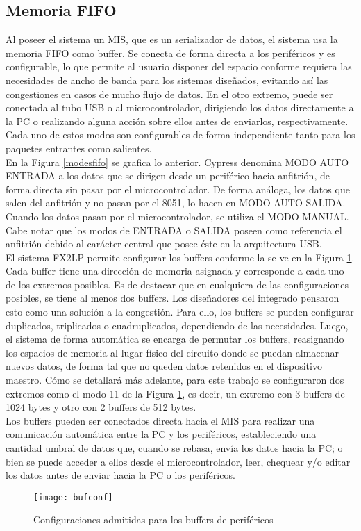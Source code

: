 	\subsection*{Memoria FIFO}
		Al poseer el sistema un MIS, que es un serializador de datos, el sistema usa la memoria FIFO como buffer.%
		Se conecta de forma directa a los periféricos y es configurable, lo que permite al usuario disponer del espacio conforme requiera las necesidades de ancho de banda para los sistemas diseñados, evitando así las congestiones en casos de mucho flujo de datos. En el otro extremo, puede ser conectada al tubo USB o al microcontrolador, dirigiendo los datos directamente a la PC o realizando alguna acción sobre ellos antes de enviarlos, respectivamente. Cada uno de estos modos son configurables de forma independiente tanto para los paquetes entrantes como salientes.\\
		
		En la Figura \ref{modesfifo} se grafica lo anterior. Cypress denomina MODO AUTO ENTRADA a los datos que se dirigen desde un periférico hacia anfitrión, de forma directa sin pasar por el microcontrolador. De forma análoga, los datos que salen del anfitrión y no pasan por el 8051, lo hacen en MODO AUTO SALIDA. Cuando los datos pasan por el microcontrolador, se utiliza el MODO MANUAL. Cabe notar que los modos de ENTRADA o SALIDA poseen como referencia el anfitrión debido al carácter central que posee éste en la arquitectura USB.\\
		
		
		El sistema FX2LP permite configurar los buffers conforme la se ve en la Figura \ref{epconfigs}. Cada buffer tiene una dirección de memoria asignada y corresponde a cada uno de los extremos posibles. Es de destacar que en cualquiera de las configuraciones posibles, se tiene al menos dos buffers. Los diseñadores del integrado pensaron esto como una solución a la congestión. Para ello, los buffers se pueden configurar duplicados, triplicados o cuadruplicados, dependiendo de las necesidades. Luego, el sistema de forma automática se encarga de permutar los buffers, reasignando los espacios de memoria al lugar físico del circuito donde se puedan almacenar nuevos datos, de forma tal que no queden datos retenidos en el dispositivo maestro. Cómo se detallará más adelante, para este trabajo se configuraron dos extremos como el modo 11 de la Figura \ref{epconfigs}, es decir, un extremo con 3 buffers de 1024 bytes y otro con 2 buffers de 512 bytes.\\
		
		Los buffers pueden ser conectados directa hacia el MIS para realizar una comunicación automática entre la PC y los periféricos, estableciendo una cantidad umbral de datos que, cuando se rebasa, envía los datos hacia la PC; o bien se puede acceder a ellos desde el microcontrolador, leer, chequear y/o editar los datos antes de enviar hacia la PC o los periféricos.\\
			
		\begin{figure}[h]
			\centering
			\texttt{[image: bufconf]}
			\caption{Configuraciones admitidas para los buffers de periféricos}
			\label{epconfigs}
		\end{figure}